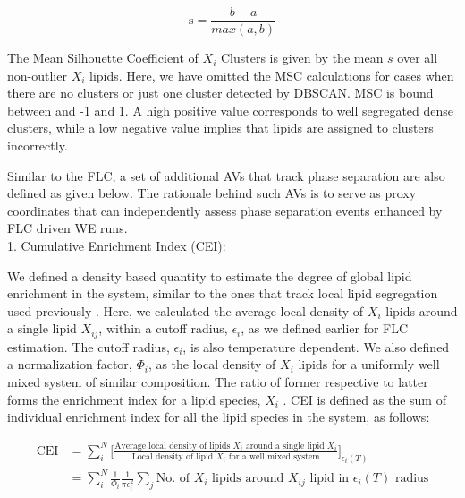 \documentclass{biophys-new}
\begin{document}
\begin{equation}
\label{eq:SC}
\text{s} = \frac{b - a}{max(a,b)}
\end{equation}

The Mean Silhouette Coefficient of $X_i$ Clusters is given by the mean $s$ over all non-outlier $X_i$ lipids.
Here, we have omitted the MSC calculations for cases when there are no clusters or just one cluster detected by DBSCAN. 
MSC is bound between and -1 and 1.
A high positive value corresponds to well segregated dense clusters, while a low negative value implies that lipids are assigned to clusters incorrectly.  

Similar to the FLC, a set of additional AVs that track phase separation are also defined as given below.
The rationale behind such AVs is to serve as proxy coordinates that can independently assess phase separation events enhanced by FLC driven WE runs.
\\

1. Cumulative Enrichment Index (CEI): 

We defined a density based quantity to estimate the degree of global lipid enrichment in the system, similar to the ones that track local lipid segregation used previously \cite{Gu2019, Gu2020}.
Here, we calculated the average local density of $X_i$ lipids around a single lipid $X_{ij}$, within a cutoff radius, $\epsilon_i$, as we defined earlier for FLC estimation.
The cutoff radius, $\epsilon_i$, is also temperature dependent.
We also defined a normalization factor, $\Phi_i$, as the local density of $X_i$ lipids for a uniformly well mixed system of similar composition.
The ratio of former respective to latter forms the enrichment index for a lipid species, $X_i$ .
CEI is defined as the sum of individual enrichment index for all the lipid species in the system, as follows:  

\begin{equation}
    \begin{aligned}
    \label{eq:CLT}
    \text{CEI} {}   & = \sum_{i}^{N}\Bigg[\frac{\text{Average local density of lipids $X_i$ around a single lipid $X_i$}}{\text{Local density of lipid $X_i$ for a well mixed system}}\Bigg]_{\text{$\epsilon_i(T)$}} \\
                    & =  \sum_{i}^{N} \frac{1}{\Phi_i}\frac{1}{\text{$\pi\epsilon_i^2$}}\sum_{j}\text{No. of $X_i$ lipids around $X_{ij}$ lipid in $\epsilon_i(T)$ radius}
    \end{aligned}
\end{equation}
\end{document}
